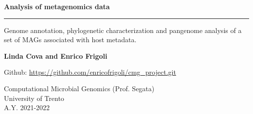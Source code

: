 \begin{titlepage}
    \begin{center}
        \vspace*{1cm}
        
        \Huge
        \textbf{Analysis of metagenomics data}

        \vspace{0.3cm}

        \rule{\textwidth}{.4pt}

        \vspace{0.5cm}
        
        \LARGE
        Genome annotation, phylogenetic characterization and pangenome analysis of
        a set of MAGs associated with host metadata.
        
        
        \vfill

        \Large
        
        \textbf{Linda Cova and Enrico Frigoli}
        
        \vspace{1cm}
        
        Github: \href{https://github.com/enricofrigoli/cmg_project.git}{https://github.com/enricofrigoli/cmg\_project.git}
        
        \vspace{0.8cm}
        
        
        \Large
        Computational Microbial Genomics (Prof. Segata) \\
        University of Trento \\
        A.Y. 2021-2022

        
    \end{center}

\end{titlepage}
